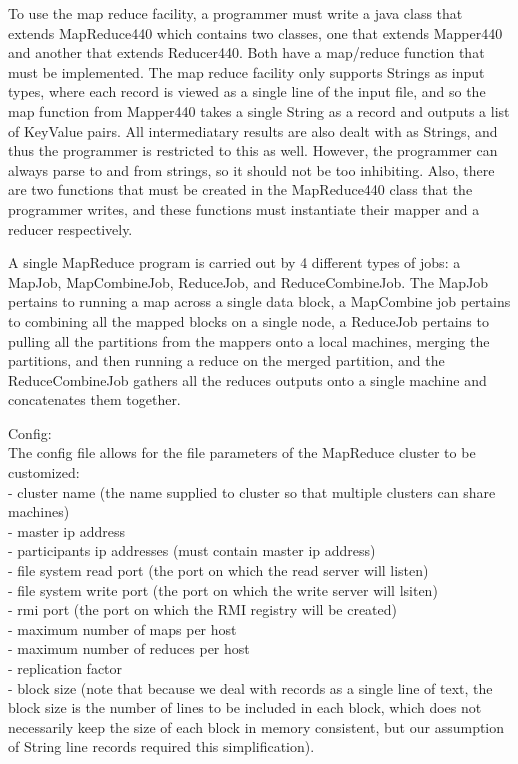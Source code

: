 \documentclass[11pt]{article}
\begin{document}
To use the map reduce facility, a programmer must write a java class that extends MapReduce440 which contains two classes, one that extends Mapper440 and another that extends Reducer440. Both have a map/reduce function that must be implemented. The map reduce facility only supports Strings as input types, where each record is viewed as a single line of the input file, and so the map function from Mapper440 takes a single String as a record and outputs a list of KeyValue pairs. All intermediatary results are also dealt with as Strings, and thus the programmer is restricted to this as well. However, the programmer can always parse to and from strings, so it should not be too inhibiting. Also, there are two functions that must be created in the MapReduce440 class that the programmer writes, and these functions must instantiate their mapper and a reducer respectively.

A single MapReduce program is carried out by 4 different types of jobs: a MapJob, MapCombineJob, ReduceJob, and ReduceCombineJob. The MapJob pertains to running a map across a single data block, a MapCombine job pertains to combining all the mapped blocks on a single node, a ReduceJob pertains to pulling all the partitions from the mappers onto a local machines, merging the partitions, and then running a reduce on the merged partition, and the ReduceCombineJob gathers all the reduces outputs onto a single machine and concatenates them together. 

Config:
\\ The config file allows for the file parameters of the MapReduce cluster to be customized:
\\ - cluster name (the name supplied to cluster so that multiple clusters can share machines)
\\ - master ip address
\\ - participants ip addresses (must contain master ip address)
\\ - file system read port (the port on which the read server will listen)
\\ - file system write port (the port on which the write server will lsiten)
\\ - rmi port (the port on which the RMI registry will be created)
\\ - maximum number of maps per host 
\\ - maximum number of reduces per host 
\\ - replication factor
\\ - block size (note that because we deal with records as a single line of text, the block size is the number of lines to be included in each block, which does not necessarily keep the size of each block in memory consistent, but our assumption of String line records required this simplification).
\end{document}

